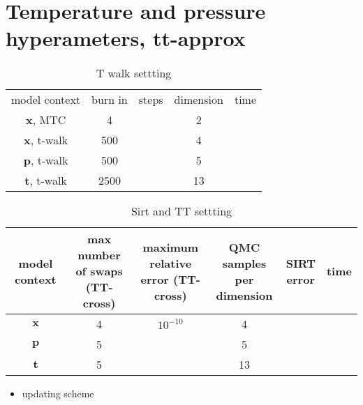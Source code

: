 \section{Temperature and pressure hyperameters, tt-approx}

\begin{table}
	\centering
	\begin{tabular}{ |c||c|c|c|c|   }
		\hline
		model context& burn in& steps & dimension & time\\ 
		\hhline{|=||=|=|=|=|}
		$\bm{x}$, MTC& 4 & \makecell[b]{ $10^{-10}$} &2 &\\ \hline
		$\bm{x}$, t-walk& 500& &4 &\\ \hline
		$\bm{p}$, t-walk & 500& &5 &\\ \hline
		$\bm{t}$, t-walk & 2500 & &13 &\\
		\hline
	\end{tabular}
	\caption{T walk settting}
	\label{tab:}
\end{table}

\begin{table}
	\centering
	\begin{tabular}{ |c||c|c|c|c|c|  }
		\hline
		model context& \makecell{max number \\of swaps (TT-cross)}& \makecell{maximum relative \\ error (TT-cross)}&\makecell{QMC samples \\per dimension}& \makecell{SIRT\\ error} & time\\ \hline
		\hline
		$\bm{x}$ & 4 & $10^{-10}$ &4& &\\ \hline
		$\bm{p}$ & 5& &5& &\\ \hline
		$\bm{t}$ & 5 & &13& &\\ 
		\hline
	\end{tabular}
	\caption{Sirt and TT settting}
	\label{tab:}
\end{table}

\begin{itemize}
	\item updating scheme
\end{itemize}

